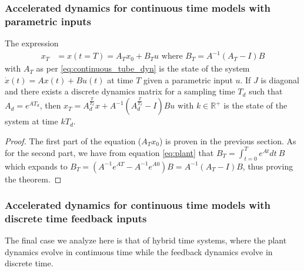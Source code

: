 \documentclass[sigconf]{llncs}
\newcommand{\mat}[1]{{#1}}
\renewcommand{\vec}[1]{{#1}}
\begin{document}
 \subsubsection{Accelerated dynamics for continuous time models with parametric inputs}\label{sec:cont_acc_param_inputs}
\begin{lemma}
The expression
 \begin{align}
 \vec{x}_T&=\vec{x}(t=T)=\mat{A}_T\vec{x}_0 + \mat{B}_T\vec{u} \text{ where } \mat{B}_T=\mat{A}^{-1}(\mat{A}_T-\mat{I})\mat{B} 
 \label{eq:param_discretize}
 \end{align}
 with $\mat{A}_T$ as per \eqref{eq:continuous_tube_dyn} is the state of the system $\dot{\vec{x}}(t)=\mat{A}\vec{x}(t)+\mat{B}\vec{u}(t)$ at time $T$ given a parametric input $\vec{u}$.
 If $\mat{J}$ is diagonal and there exists a discrete dynamics matrix for a sampling time $T_d$ such that $A_d=e^{\mat{A} T_d}$, then $\vec{x}_T=A_d^{\frac{T}{T_d}}\vec{x}+\mat{A}^{-1}(\mat{A}_d^{\frac{T}{T_d}}-\mat{I})\mat{B}\vec{u} \text{ with } k \in \mathbb{R}^+$ is the state of the system at time $kT_d$.
 \end{lemma}
 \begin{proof}
 The first part of the equation ($\mat{A}_T\vec{x}_0$) is proven in the previous section.  As for the second part, we have from equation \eqref{eq:plant}
that $\mat{B}_T = \int_{t = 0}^{T} e^{\mat{A} t} dt\ \mat{B}$ which expands to $\mat{B}_T= (\mat{A}^{-1} e^{\mat{A}T}-\mat{A}^{-1} e^{\mat{A} 0}) \mat{B}=\mat{A}^{-1}(\mat{A}_T-\mat{I})\mat{B}$, thus proving the theorem.
 \end{proof}
  
 \subsubsection{Accelerated dynamics for continuous time models with discrete time feedback inputs}\label{asec:real_discrete_feedback_inputs}

The final case we analyze here is that of hybrid time systems, where the
plant dynamics evolve in continuous time while the feedback dynamics evolve
in discrete time.
\end{document}
